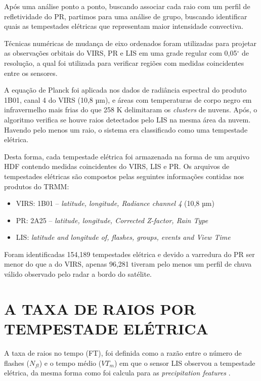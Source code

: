 Após uma análise ponto a ponto, buscando associar cada raio com um perfil de refletividade do PR, partimos para uma análise de grupo, buscando identificar quais as tempestades elétricas que representam maior intensidade convectiva.

Técnicas numéricas de mudança de eixo ordenados foram utilizadas para projetar as
observações orbitais do VIRS, PR e LIS em uma grade regular com 0,05$^{\circ}$ de resolução, a qual foi utilizada para verificar regiões com medidas coincidentes entre os sensores.

A equação de Planck foi aplicada nos dados de radiância espectral do produto 1B01, canal 4 do VIRS (10,8 µm), e áreas com temperaturas de corpo negro em infravermelho mais frias do que 258 K delimitaram os \textit{clusters} de nuvens. Após, o algoritmo verifica se houve raios detectados pelo LIS na mesma área da nuvem. Havendo pelo menos um raio, o sistema era classificado como uma tempestade elétrica. 

Desta forma, cada tempestade elétrica foi armazenada na forma de um arquivo HDF contendo medidas coincidentes do VIRS, LIS e PR. Os arquivos de tempestades elétricas são compostos pelas seguintes informações contidas nos produtos do TRMM:

\begin{itemize}
\item VIRS: 1B01 -- \textit{latitude, longitude, Radiance channel 4} (10,8 µm)
\item PR: 2A25 -- \textit{latitude, longitude, Corrected Z-factor, Rain Type} 
\item LIS: \textit{latitude and longitude of, flashes, groups, events and View Time}  
\end{itemize} 

Foram identificadas 154,189 tempestades elétrica e devido a varredura do PR ser menor do que a do VIRS, apenas 96,281 tiveram pelo menos um perfil de chuva válido observado pelo radar a bordo do satélite.


\section{A TAXA DE RAIOS POR TEMPESTADE ELÉTRICA}

A taxa de raios no tempo (FT), foi definida como a razão entre o número de flashes ($N_{fl}$) e o tempo médio ($VT_m$) em que o sensor LIS observou a tempestade elétrica, da mesma forma como foi calcula para as \textit{precipitation features} \cite{cecil2005, Nesbitt2000}. 

